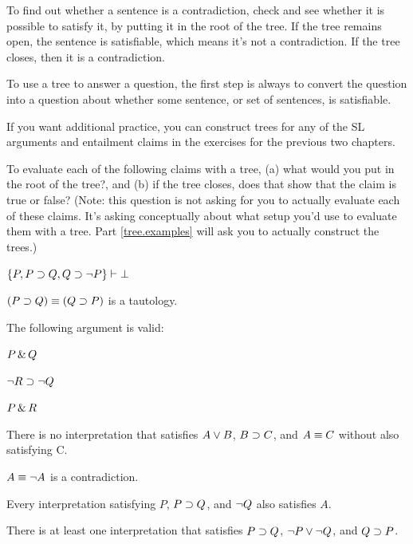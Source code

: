 To find out whether a sentence is a contradiction, check and see whether it is possible to satisfy it, by putting it in the root of the tree. If the tree remains open, the sentence is satisfiable, which means it's not a contradiction. If the tree closes, then it is a contradiction.

To use a tree to answer a question, the first step is always to convert the question into a question about whether some sentence, or set of sentences, is satisfiable. 


\practiceproblems
If you want additional practice, you can construct trees for any of the SL arguments and entailment claims in the exercises for the previous two chapters.

\solutions
\problempart 
\label{pr.sl.treeroot}
To evaluate each of the following claims with a tree, (a) what would you put in the root of the tree?, and (b) if the tree closes, does that show that the claim is true or false? (Note: this question is not asking for you to actually evaluate each of these claims. It's asking conceptually about what setup you'd use to evaluate them with a tree. Part \ref{tree.examples} will ask you to actually construct the trees.)
\begin{earg}
\item $\{P, P \supset Q, Q \supset \neg P\} \vdash{}\bot$
\item $(P \supset Q) \equiv (Q \supset P)$ is a tautology.
\item The following argument is valid:
	\begin{ekey}
		\item[] $P \,\&\, Q$
		\item[] $\neg R \supset \neg Q$
		\item[\therefore] $P \,\&\, R$
	\end{ekey}
\item There is no interpretation that satisfies $A \vee B$, $B \supset C$, and $A \equiv C$ without also satisfying C.
\item $A \equiv \neg A$ is a contradiction.
\item Every interpretation satisfying $P$, $P \supset Q$, and $\neg Q$ also satisfies $A$.
\item There is at least one interpretation that satisfies $P \supset Q$, $\neg P \vee \neg Q$, and $Q \supset P$.
 \end{earg}




